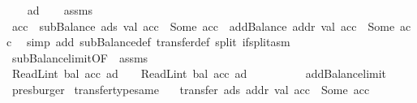\begin{isabellebody}
%
\isadelimproof
%
\endisadelimproof
%
\isatagproof
{}\isamarkupfalse%
\isanewline
\ \ \isamarkupfalse%
\ ad{\isacharprime}{\kern0pt}\isanewline
\ \ \isamarkupfalse%
\ assms{\isacharparenleft}{\kern0pt}{}{\isacharparenright}{\kern0pt}\ \isamarkupfalse%
\ acc{\isacharprime}{\kern0pt}{\isacharprime}{\kern0pt}\ \ {\isachardoublequoteopen}subBalance\ ads\ val\ acc\ {\isacharequal}{\kern0pt}\ Some\ acc{\isacharprime}{\kern0pt}{\isacharprime}{\kern0pt}{\isachardoublequoteclose}\ \ {\isachardoublequoteopen}addBalance\ addr\ val\ acc{\isacharprime}{\kern0pt}{\isacharprime}{\kern0pt}\ {\isacharequal}{\kern0pt}\ Some\ acc{\isacharprime}{\kern0pt}{\isachardoublequoteclose}\ \isamarkupfalse%
\ {\isacharparenleft}{\kern0pt}simp\ add{\isacharcolon}{\kern0pt}\ subBalance{\isacharunderscore}{\kern0pt}def\ transfer{\isacharunderscore}{\kern0pt}def\ split{\isacharcolon}{\kern0pt}\ if{\isacharunderscore}{\kern0pt}split{\isacharunderscore}{\kern0pt}asm{\isacharparenright}{\kern0pt}\isanewline
\ \ \isamarkupfalse%
\ subBalance{\isacharunderscore}{\kern0pt}limit{\isacharbrackleft}{\kern0pt}OF\ {\isacharunderscore}{\kern0pt}\ assms{\isacharparenleft}{\kern0pt}{}{\isacharparenright}{\kern0pt}{\isacharbrackright}{\kern0pt}\isanewline
\ \ \isamarkupfalse%
\ {\isachardoublequoteopen}ReadL\isactrlsub i\isactrlsub n\isactrlsub t\ {\isacharparenleft}{\kern0pt}bal\ {\isacharparenleft}{\kern0pt}acc{\isacharprime}{\kern0pt}\ ad{\isacharprime}{\kern0pt}{\isacharparenright}{\kern0pt}{\isacharparenright}{\kern0pt}\ {\isasymge}\ {}\ {\isasymand}\ ReadL\isactrlsub i\isactrlsub n\isactrlsub t\ {\isacharparenleft}{\kern0pt}bal\ {\isacharparenleft}{\kern0pt}acc{\isacharprime}{\kern0pt}\ ad{\isacharprime}{\kern0pt}{\isacharparenright}{\kern0pt}{\isacharparenright}{\kern0pt}\ {\isacharless}{\kern0pt}\ {}\ {\isacharcircum}{\kern0pt}\ {}{}{}{\isachardoublequoteclose}\isanewline
\ \ \ \ \isamarkupfalse%
\ addBalance{\isacharunderscore}{\kern0pt}limit\ \isamarkupfalse%
\ presburger\isanewline
{}\isamarkupfalse%
%
\endisatagproof
{\isafoldproof}%
%
\isadelimproof
\isanewline
%
\endisadelimproof
\isanewline
{}\isamarkupfalse%
\ transfer{\isacharunderscore}{\kern0pt}type{\isacharunderscore}{\kern0pt}same{\isacharcolon}{\kern0pt}\isanewline
\ \ \ {\isachardoublequoteopen}transfer\ ads\ addr\ val\ acc\ {\isacharequal}{\kern0pt}\ Some\ acc{\isacharprime}{\kern0pt}{\isachardoublequoteclose}\isanewline

\end{isabellebody}

